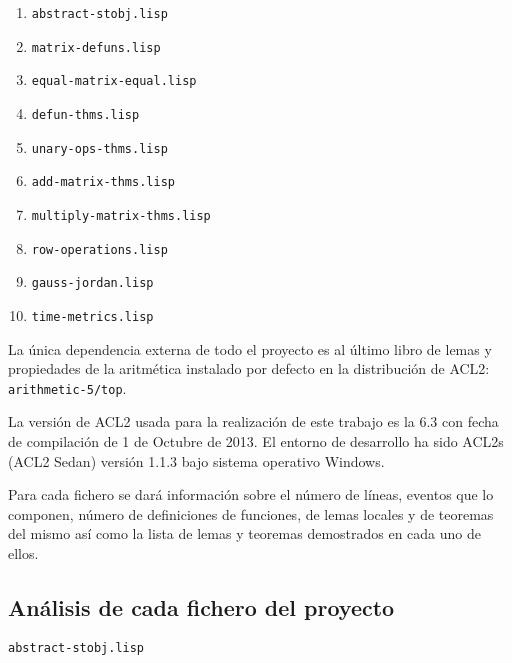 \documentclass[a4paper,10pt]{article}
\begin{document}
\par \vspace{10pt}

\begin{enumerate}
	\item \texttt{abstract-stobj.lisp}
	\item \texttt{matrix-defuns.lisp}
	\item \texttt{equal-matrix-equal.lisp}
	\item \texttt{defun-thms.lisp}
	\item \texttt{unary-ops-thms.lisp}
	\item \texttt{add-matrix-thms.lisp}
	\item \texttt{multiply-matrix-thms.lisp}
	\item \texttt{row-operations.lisp}
	\item \texttt{gauss-jordan.lisp}
	\item \texttt{time-metrics.lisp}
\end{enumerate}

\par \vspace{10pt}

La única dependencia externa de todo el proyecto es al último libro de lemas y propiedades de la aritmética instalado por defecto en la distribución de ACL2: \texttt{arithmetic-5/top}.

\par \vspace{10pt}

La versión de ACL2 usada para la realización de este trabajo es la 6.3 con fecha de compilación de 1 de Octubre de 2013. El entorno de desarrollo ha sido ACL2s (ACL2 Sedan) versión 1.1.3 bajo sistema operativo Windows.

\par \vspace{10pt}

Para cada fichero se dará información sobre el número de líneas, eventos que lo componen, número de definiciones de funciones, de lemas locales y de teoremas del mismo así como la lista de lemas y teoremas demostrados en cada uno de ellos.

\vspace{24pt}
\subsection{Análisis de cada fichero del proyecto}

\par \vspace{24pt}
\texttt{abstract-stobj.lisp}
\end{document}
